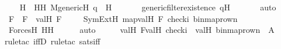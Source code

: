\begin{isabellebody}
\isanewline
\ \ \isamarkupfalse%
\ H\ \ HH{\isacharcolon}{\kern0pt}\ {\isachardoublequoteopen}M{\isacharunderscore}{\kern0pt}generic{\isacharparenleft}{\kern0pt}H{\isacharparenright}{\kern0pt}{\isachardoublequoteclose}\ {\isachardoublequoteopen}q\ {\isasymin}\ H{\isachardoublequoteclose}\ \isanewline
\ \ \ \ \isamarkupfalse%
\ generic{\isacharunderscore}{\kern0pt}filter{\isacharunderscore}{\kern0pt}existence\ qH\ \isanewline
\ \ \ \ \isamarkupfalse%
\ auto\isanewline
\ \ \isanewline
\ \ \isamarkupfalse%
\ F\ \ {\isachardoublequoteopen}F\ {\isasymequiv}\ val{\isacharparenleft}{\kern0pt}H{\isacharcomma}{\kern0pt}\ F{\isacharprime}{\kern0pt}{\isacharparenright}{\kern0pt}{\isachardoublequoteclose}\ \isanewline
\isanewline
\ \ \isamarkupfalse%
\ {\isachardoublequoteopen}SymExt{\isacharparenleft}{\kern0pt}H{\isacharparenright}{\kern0pt}{\isacharcomma}{\kern0pt}\ map{\isacharparenleft}{\kern0pt}val{\isacharparenleft}{\kern0pt}H{\isacharparenright}{\kern0pt}{\isacharcomma}{\kern0pt}\ {\isacharbrackleft}{\kern0pt}F{\isacharprime}{\kern0pt}{\isacharcomma}{\kern0pt}\ check{\isacharparenleft}{\kern0pt}i{\isacharparenright}{\kern0pt}{\isacharcomma}{\kern0pt}\ binmap{\isacharunderscore}{\kern0pt}row{\isacharprime}{\kern0pt}{\isacharparenleft}{\kern0pt}n{\isacharparenright}{\kern0pt}{\isacharbrackright}{\kern0pt}{\isacharparenright}{\kern0pt}\ {\isasymTurnstile}\ {\isasymphi}{\isachardoublequoteclose}\ \isanewline
\ \ \ \ \isamarkupfalse%
\ ForcesH{}\ HH\isanewline
\ \ \ \ \isamarkupfalse%
\ auto\isanewline
\ \ \isamarkupfalse%
\ \isamarkupfalse%
\ {\isachardoublequoteopen}val{\isacharparenleft}{\kern0pt}H{\isacharcomma}{\kern0pt}\ F{\isacharprime}{\kern0pt}{\isacharparenright}{\kern0pt}{\isacharbackquote}{\kern0pt}val{\isacharparenleft}{\kern0pt}H{\isacharcomma}{\kern0pt}\ check{\isacharparenleft}{\kern0pt}i{\isacharparenright}{\kern0pt}{\isacharparenright}{\kern0pt}\ {\isacharequal}{\kern0pt}\ val{\isacharparenleft}{\kern0pt}H{\isacharcomma}{\kern0pt}\ binmap{\isacharunderscore}{\kern0pt}row{\isacharprime}{\kern0pt}{\isacharparenleft}{\kern0pt}n{\isacharparenright}{\kern0pt}{\isacharparenright}{\kern0pt}{\isachardoublequoteclose}\ {\isacharparenleft}{\kern0pt}\ {\isacharquery}{\kern0pt}A{\isacharparenright}{\kern0pt}\isanewline
\ \ \ \ \isamarkupfalse%
{\isacharparenleft}{\kern0pt}rule{\isacharunderscore}{\kern0pt}tac\ iffD{}{\isacharcomma}{\kern0pt}\ rule{\isacharunderscore}{\kern0pt}tac\ sats{\isacharunderscore}{\kern0pt}{\isasymphi}{\isacharunderscore}{\kern0pt}iff{\isacharparenright}{\kern0pt}\isanewline

\end{isabellebody}
